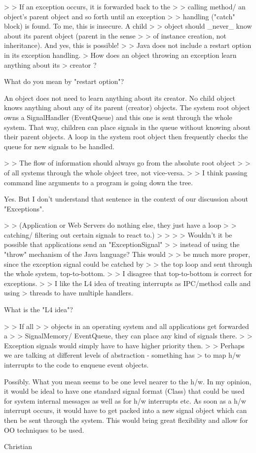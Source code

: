 > > If an exception occurs, it is forwarded back to the
> > calling method/ an object's parent object and so forth until an exception
> > handling ("catch" block) is found. To me, this is insecure. A child
> > object should _never_ know about its parent object (parent in the sense
> > of instance creation, not inheritance). And yes, this is possible!
>
> Java does not include a restart option in its exception handling.
> How does an object throwing an exception learn anything about its
> creator ?

What do you mean by "restart option"?

An object does not need to learn anything about its creator. No child
object knows anything about any of its parent (creator) objects.
The system root object owns a SignalHandler (EventQueue) and this one
is sent through the whole system. That way, children can place signals
in the queue without knowing about their parent objects.
A loop in the system root object then frequently checks the queue for
new signals to be handled.

> > The flow of information should always go from the absolute root object
> > of all systems through the whole object tree, not vice-versa.
>
> I think passing command line arguments to a program is going down the tree.

Yes. But I don't understand that sentence in the context of our discussion
about "Exceptions".

> > (Application or Web Servers do nothing else, they just have a loop
> > catching/ filtering out certain signals to react to.)
> >
> > Wouldn't it be possible that applications send an "ExceptionSignal"
> > instead of using the "throw" mechanism of the Java language? This would
> > be much more proper, since the exception signal could be catched by
> > the top loop and sent through the whole system, top-to-bottom.
>
> I disagree that top-to-bottom is correct for exceptions.
>
> I like the L4 idea of treating interrupts as IPC/method calls and using
> threads to have multiple handlers.

What is the "L4 idea"?

> > If all
> > objects in an operating system and all applications get forwarded a
> > SignalMemory/ EventQueue, they can place any kind of signals there.
> > Exception signals would simply have to have higher priority then.
>
> Perhaps we are talking at different levels of abstraction - something has
> to map h/w interrupts to the code to enqueue event objects.

Possibly. What you mean seems to be one level nearer to the h/w. In my
opinion, it would be ideal to have one standard signal format (Class)
that could be used for system internal messages as well as for h/w
interrupts etc. As soon as a h/w interrupt occurs, it would have to get
packed into a new signal object which can then be sent through the
system. This would bring great flexibility and allow for OO techniques
to be used.

Christian
